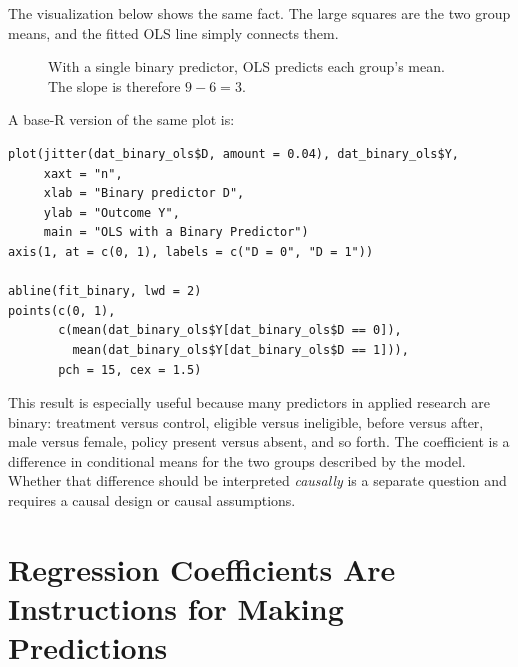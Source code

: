 \documentclass[11pt]{report}
\begin{document}
The visualization below shows the same fact. The large squares are the two group means, and the fitted OLS line simply connects them.

\begin{figure}[H]
\centering
{}
\caption{With a single binary predictor, OLS predicts each group's mean. The slope is therefore \(9-6=3\).}
\label{fig:binarymean}
\end{figure}

A base-R version of the same plot is:

\begin{lstlisting}
plot(jitter(dat_binary_ols$D, amount = 0.04), dat_binary_ols$Y,
     xaxt = "n",
     xlab = "Binary predictor D",
     ylab = "Outcome Y",
     main = "OLS with a Binary Predictor")
axis(1, at = c(0, 1), labels = c("D = 0", "D = 1"))

abline(fit_binary, lwd = 2)
points(c(0, 1),
       c(mean(dat_binary_ols$Y[dat_binary_ols$D == 0]),
         mean(dat_binary_ols$Y[dat_binary_ols$D == 1])),
       pch = 15, cex = 1.5)
\end{lstlisting}

This result is especially useful because many predictors in applied research are binary: treatment versus control, eligible versus ineligible, before versus after, male versus female, policy present versus absent, and so forth. The coefficient is a difference in conditional means for the two groups described by the model. Whether that difference should be interpreted \emph{causally} is a separate question and requires a causal design or causal assumptions.

\section{Regression Coefficients Are Instructions for Making Predictions}
\end{document}
